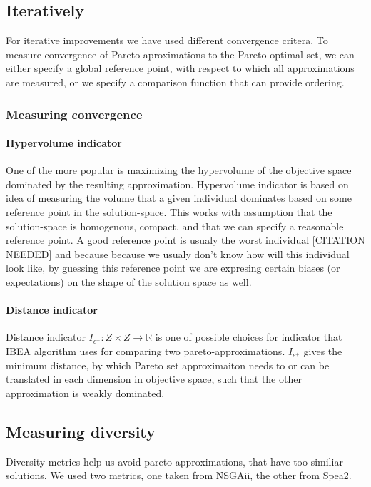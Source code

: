 \documentclass[12pt,oneside,draft]{fithesis2}
\begin{document}
\subsection{Iteratively}

For iterative improvements we have used different convergence critera. To measure convergence of Pareto aproximations to the Pareto optimal set, we can either specify a global reference point, with respect to which all approximations are measured, or we specify a comparison function that can provide ordering.

\subsubsection{Measuring convergence}

\paragraph{Hypervolume indicator}
One of the more popular is maximizing the hypervolume of the objective space dominated by the resulting approximation. Hypervolume indicator is based on idea of measuring the volume that a given individual dominates based on some reference point in the solution-space. This works with assumption that the solution-space is homogenous, compact, and that we can specify a reasonable reference point. A good reference point is usualy the worst individual [CITATION NEEDED] and because because we usualy don't know how will this individual look like, by guessing this reference point we are expresing certain biases (or expectations) on the shape of the solution space as well.

\paragraph{Distance indicator}
Distance indicator $I_{\epsilon^{+}}: Z \times Z \to  \mathbb{R}$ is one of possible choices for indicator that IBEA algorithm uses for comparing two pareto-approximations. $I_{\epsilon^{+}}$ gives the minimum distance, by which Pareto set approximaiton needs to or can be translated in each dimension in objective space, such that the other approximation is weakly dominated.

\subsection{Measuring diversity}
Diversity metrics help us avoid pareto approximations, that have too similiar solutions. We used two metrics, one taken from NSGAii, the other from Spea2.
\end{document}
